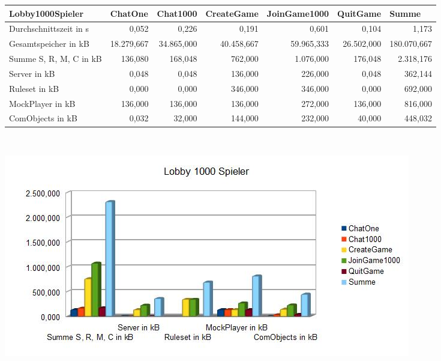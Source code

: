 \documentclass[a4paper]{article}
\begin{document}
\noindent
\begin{tabular}{|l|r|r|r|r|r|r|}
\hline
Lobby1000Spieler & \multicolumn{1}{l|}{ChatOne} & \multicolumn{1}{l|}{Chat1000} & \multicolumn{1}{l|}{CreateGame} & \multicolumn{1}{l|}{JoinGame1000} & \multicolumn{1}{l|}{QuitGame} & \multicolumn{1}{l|}{Summe} \\ \hline \hline
Durchschnittszeit in s & 0,052 & 0,226 & 0,191 & 0,601 & 0,104 & 1,173 \\ \hline
Gesamtspeicher in kB & 18.279,667 & 34.865,000 & 40.458,667 & 59.965,333 & 26.502,000 & 180.070,667 \\ \hline
Summe S, R, M, C in kB & 136,080 & 168,048 & 762,000 & 1.076,000 & 176,048 & 2.318,176 \\ \hline
Server in kB & 0,048 & 0,048 & 136,000 & 226,000 & 0,048 & 362,144 \\ \hline
Ruleset in kB & 0,000 & 0,000 & 346,000 & 346,000 & 0,000 & 692,000 \\ \hline
MockPlayer in kB & 136,000 & 136,000 & 136,000 & 272,000 & 136,000 & 816,000 \\ \hline
ComObjects in kB & 0,032 & 32,000 & 144,000 & 232,000 & 40,000 & 448,032 \\ \hline
\end{tabular}
\ \\

\begin{center}
\includegraphics[scale=0.7]{2}
\end{center}
\end{document}

